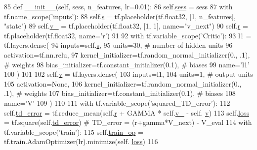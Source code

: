 \begin{DoxyCode}
85     \textcolor{keyword}{def }\hyperlink{classddpg__others_1_1_critic_ad79f6a3961bf9da84b50feb690f72708}{\_\_init\_\_}(self, sess, n\_features, lr=0.01):
86         self.\hyperlink{classddpg__others_1_1_critic_ab0c8a33f283df68173a93990084034de}{sess} = sess
87         with tf.name\_scope(\textcolor{stringliteral}{'inputs'}):
88             self.\hyperlink{classddpg__others_1_1_critic_a6d70d80341ad76c8c12ddaf0e06e513a}{s} = tf.placeholder(tf.float32, [1, n\_features], \textcolor{stringliteral}{"state"})
89             self.\hyperlink{classddpg__others_1_1_critic_a44cb021fd77cfeb1515d1421ea1135cd}{v\_} = tf.placeholder(tf.float32, [1, 1], name=\textcolor{stringliteral}{"v\_next"})
90             self.\hyperlink{classddpg__others_1_1_critic_a127f5c9ec25bd223417b5f478bc2a11f}{r} = tf.placeholder(tf.float32, name=\textcolor{stringliteral}{'r')}
91 \textcolor{stringliteral}{}
92 \textcolor{stringliteral}{        with tf.variable\_scope('Critic'}):
93             l1 = tf.layers.dense(
94                 inputs=self.\hyperlink{classddpg__others_1_1_critic_a6d70d80341ad76c8c12ddaf0e06e513a}{s},
95                 units=30,  \textcolor{comment}{# number of hidden units}
96                 activation=tf.nn.relu,
97                 kernel\_initializer=tf.random\_normal\_initializer(0., .1),  \textcolor{comment}{# weights}
98                 bias\_initializer=tf.constant\_initializer(0.1),  \textcolor{comment}{# biases}
99                 name=\textcolor{stringliteral}{'l1'}
100             )
101 
102             self.\hyperlink{classddpg__others_1_1_critic_a4ea207b84e027e537185c3067f21e8fd}{v} = tf.layers.dense(
103                 inputs=l1,
104                 units=1,  \textcolor{comment}{# output units}
105                 activation=\textcolor{keywordtype}{None},
106                 kernel\_initializer=tf.random\_normal\_initializer(0., .1),  \textcolor{comment}{# weights}
107                 bias\_initializer=tf.constant\_initializer(0.1),  \textcolor{comment}{# biases}
108                 name=\textcolor{stringliteral}{'V'}
109             )
110 
111         with tf.variable\_scope(\textcolor{stringliteral}{'squared\_TD\_error'}):
112             self.\hyperlink{classddpg__others_1_1_critic_acd08db4e575e41c9b40c89aeb70b69fc}{td\_error} = tf.reduce\_mean(self.\hyperlink{classddpg__others_1_1_critic_a127f5c9ec25bd223417b5f478bc2a11f}{r} + GAMMA * self.\hyperlink{classddpg__others_1_1_critic_a44cb021fd77cfeb1515d1421ea1135cd}{v\_} - self.
      \hyperlink{classddpg__others_1_1_critic_a4ea207b84e027e537185c3067f21e8fd}{v})
113             self.\hyperlink{classddpg__others_1_1_critic_a234f0de11677fd4cc6b2387173ed5065}{loss} = tf.square(self.\hyperlink{classddpg__others_1_1_critic_acd08db4e575e41c9b40c89aeb70b69fc}{td\_error})    \textcolor{comment}{# TD\_error = (r+gamma*V\_next) - V\_eval}
114         with tf.variable\_scope(\textcolor{stringliteral}{'train'}):
115             self.\hyperlink{classddpg__others_1_1_critic_a3c9fc0fa915bdd1c961e8a94b60e486f}{train\_op} = tf.train.AdamOptimizer(lr).minimize(self.
      \hyperlink{classddpg__others_1_1_critic_a234f0de11677fd4cc6b2387173ed5065}{loss})
116 
\end{DoxyCode}


